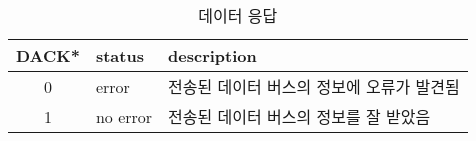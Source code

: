 %
%
\begin{table}[htbp]
\caption{데이터 응답}
   \begin{center}
   \begin{tabular}{|c|l|l|} \hline
      DACK* & status & description \\ \hline \hline
      0 & error & 전송된 데이터 버스의 정보에 오류가 발견됨 \\ \hline
      1 & no error & 전송된 데이터 버스의 정보를 잘 받았음 \\ \hline
   \end{tabular}
   \end{center}
\end{table}
%
%
